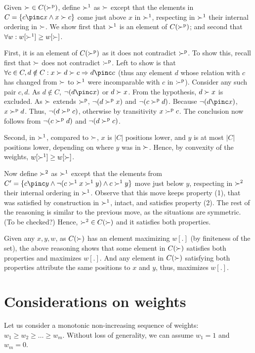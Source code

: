Given ${\succ} \in C(\succ^\text{p})$, define $\succ^1$ as $\succ$ except that the elements in $C = \{c \pinc x \land x \pref c\}$ come just above $x$ in $\succ^1$, respecting in $\succ^1$ their internal ordering in $\succ$. We show first that $\succ^1$ is an element of $C(\succ^\text{p})$; and second that $\forall w: w[\succ^1] \geq w[\succ]$. 

First, it is an element of $C(\succ^\text{p})$ as it does not contradict $\succ^\text{p}$. To show this, recall first that $\succ$ does not contradict $\succ^\text{p}$. Left to show is that $\forall c \in C, d \notin C: x \pref d \pref c \Rightarrow d \pinc c$ (thus any element $d$ whose relation with $c$ has changed from $\succ$ to $\succ^1$ were incomparable with $c$ in $\succ^\text{p}$). Consider any such pair $c, d$. As $d \notin C$, $\lnot(d \pinc x)$ or $d \succ x$. From the hypothesis, $d \succ x$ is excluded. 
As $\succ$ extends $\succ^\text{p}$, $\lnot(d \succ^\text{p} x)$ and $\lnot (c \succ^\text{p} d)$. Because $\lnot (d \pinc x)$, $x \succ^\text{p} d$. Thus, $\lnot (d \succ^\text{p} c)$, otherwise by transitivity $x \succ^\text{p} c$. The conclusion now follows from $\lnot (c \succ^\text{p} d)$ and $\lnot (d \succ^\text{p} c)$.

Second, in $\succ^1$, compared to $\succ$, $x$ is $|C|$ positions lower, and $y$ is at most $|C|$ positions lower, depending on where $y$ was in $\succ$. Hence, by convexity of the weights, $w[\succ^1] \geq w[\succ]$.

Now define $\succ^2$ as $\succ^1$ except that the elements from $C' = \{c \pinc y \land \lnot (c \pref^1 x \pref^1 y) \land c \pref^1 y\}$ move just below $y$, respecting in $\succ^2$ their internal ordering in $\succ^1$. Observe that this move keeps property (1), that was satisfied by construction in $\succ^1$, intact, and satisfies property (2). The rest of the reasoning is similar to the previous move, as the situations are symmetric. (To be checked?) Hence, ${\succ^2} \in C(\succ)$ and it satisfies both properties.

Given any $x, y, w$, as $C(\succ)$ has an element maximizing $w[.]$ (by finiteness of the set), the above reasoning shows that some element in $C(\succ)$ satisfies both properties and maximizes $w[.]$. And any element in $C(\succ)$ satisfying both properties attribute the same positions to $x$ and $y$, thus, maximizes $w[.]$.

\section{Considerations on weights}
\label{sec:weights}
Let us consider a monotonic non-increasing sequence of weights: $w_{1} \geq w_{2} \geq \ldots \geq w_{m}$. Without loss of generality, we can assume $w_1=1$ and $w_m=0$.

